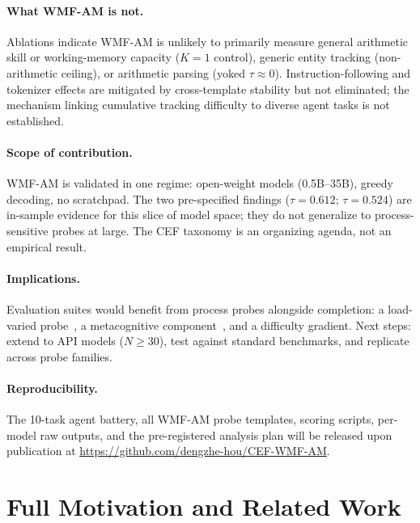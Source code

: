 \documentclass{article}
\begin{document}
\paragraph{What WMF-AM is not.}
Ablations indicate WMF-AM is unlikely to primarily measure general
arithmetic skill or working-memory capacity ($K{=}1$ control), generic
entity tracking (non-arithmetic ceiling), or arithmetic parsing
(yoked $\tau \approx 0$).
Instruction-following and tokenizer effects are mitigated by
cross-template stability but not eliminated; the mechanism linking
cumulative tracking difficulty to diverse agent tasks is not established.

\paragraph{Scope of contribution.}
WMF-AM is validated in one regime: open-weight models (0.5B--35B),
greedy decoding, no scratchpad.
The two pre-specified findings ($\tau{=}0.612$; $\tau{=}0.524$) are
in-sample evidence for this slice of model space; they do not
generalize to process-sensitive probes at large.
The CEF taxonomy is an organizing agenda, not an empirical result.

\paragraph{Implications.}
Evaluation suites would benefit from process probes alongside
completion: a load-varied probe~\citep{zhang2024working}, a
metacognitive component~\citep{lightman2023verify}, and a difficulty
gradient. Next steps: extend to API models ($N{\geq}30$), test against
standard benchmarks, and replicate across probe families.

\paragraph{Reproducibility.}
The 10-task agent battery, all WMF-AM probe templates, scoring scripts,
per-model raw outputs, and the pre-registered analysis plan
will be released upon publication at
\url{https://github.com/dengzhe-hou/CEF-WMF-AM}.




\appendix

\section{Full Motivation and Related Work}
\label{app:related_full}
\end{document}
